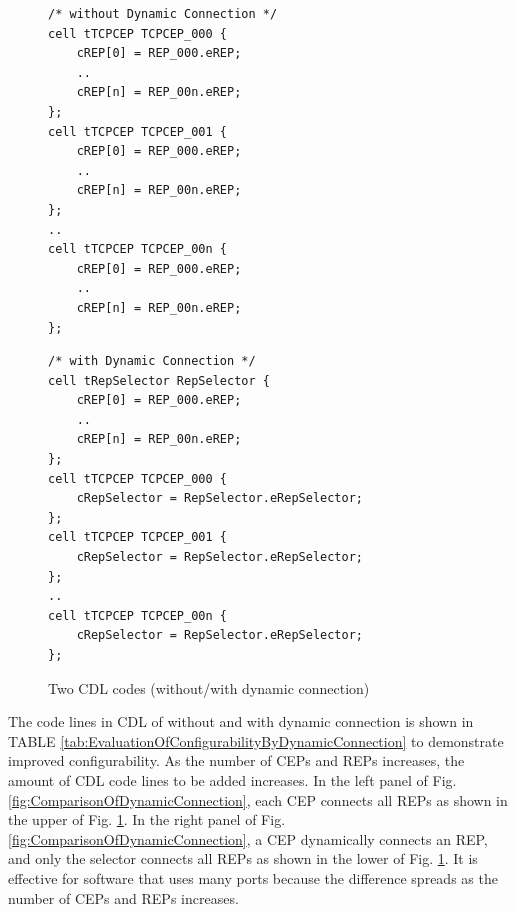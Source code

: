 \documentclass[conference]{IEEEtran/IEEEtran}
\begin{document}
\begin{figure}[t]
 \centering
 \begin{lstlisting}
/* without Dynamic Connection */
cell tTCPCEP TCPCEP_000 {
    cREP[0] = REP_000.eREP;
    ..
    cREP[n] = REP_00n.eREP;
};
cell tTCPCEP TCPCEP_001 {
    cREP[0] = REP_000.eREP;
    ..
    cREP[n] = REP_00n.eREP;
};
..
cell tTCPCEP TCPCEP_00n {
    cREP[0] = REP_000.eREP;
    ..
    cREP[n] = REP_00n.eREP;
};
 \end{lstlisting}
 \centering
 \begin{lstlisting}
/* with Dynamic Connection */
cell tRepSelector RepSelector {
    cREP[0] = REP_000.eREP;
    ..
    cREP[n] = REP_00n.eREP;
};
cell tTCPCEP TCPCEP_000 {
    cRepSelector = RepSelector.eRepSelector;
};
cell tTCPCEP TCPCEP_001 {
    cRepSelector = RepSelector.eRepSelector;
};
..
cell tTCPCEP TCPCEP_00n {
    cRepSelector = RepSelector.eRepSelector;
};
 \end{lstlisting}
 \vspace{-1mm} \caption{Two CDL codes (without/with dynamic connection)}
 \vspace{-1mm} \label{src:ComparisonOfCDL}
\end{figure}

The code lines in CDL of without and with dynamic connection is shown in TABLE \ref{tab:EvaluationOfConfigurabilityByDynamicConnection} to demonstrate improved configurability.
As the number of CEPs and REPs increases, the amount of CDL code lines to be added increases.
In the left panel of Fig. \ref{fig:ComparisonOfDynamicConnection}, each CEP connects all REPs as shown in the upper of Fig. \ref{src:ComparisonOfCDL}. 
In the right panel of Fig. \ref{fig:ComparisonOfDynamicConnection}, a CEP dynamically connects an REP, and only the selector connects all REPs as shown in the lower of Fig. \ref{src:ComparisonOfCDL}. 
It is effective for software that uses many ports because the difference spreads as the number of CEPs and REPs increases.
\end{document}
